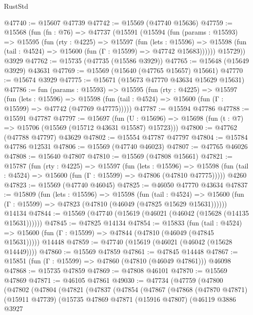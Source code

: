 \begin{lexlean}{RustStd}
\begin{coremodule}
@47740 := @15607 @47739
@47742 := @15569 (@47740 @15636)
@47759 := @15568
    (fun (fn : @76) =>
    @47737
      (@15591
        (@15594
          (fun (params : @15593) =>
          @15595
            (fun (rty : @4225) =>
            @15597
              (fun (lets : @15596) =>
              @15598 (fun (tail : @4524) => @15600 (fun (Γ : @15599) => @47742 @15683))))))
        @15729))
    @3929
@47762 := @15735 (@47735 (@15586 @3929))
@47765 := @15648 (@15649 @3929) @43631
@47769 := @15569 (@15640 (@47765 @15657) @15661)
@47770 := @15674 @3929
@47775 := @15671 (@15673 @47770 @43634 @15629 @15631)
@47786 := fun (params : @15593) =>
  @15595
    (fun (rty : @4225) =>
    @15597
      (fun (lets : @15596) =>
      @15598 (fun (tail : @4524) => @15600 (fun (Γ : @15599) => @47742 (@47769 @47775)))))
@47787 := @15594 @47786
@47788 := @15591 @47787
@47797 := @15697
    (fun (U : @15696) => @15698 (fun (t : @7) => @15706 (@15569 (@15712 @43631 @15587) @15723)))
@47800 := @47762 (@47788 @47797) @43629
@47802 := @15554 @47787 @47797
@47804 := @15784 @47786 @12531
@47806 := @15569 (@47740 @46023)
@47807 := @47765 @46026
@47808 := @15640 @47807
@47810 := @15569 (@47808 @15661)
@47821 := @15787
    (fun (rty : @4225) =>
    @15597
      (fun (lets : @15596) =>
      @15598 (fun (tail : @4524) => @15600 (fun (Γ : @15599) => @47806 (@47810 @47775)))))
    @4260
@47823 := @15569 (@47740 @46045)
@47825 := @46050 @47770 @43634
@47837 := @15809
    (fun (lets : @15596) =>
    @15598
      (fun (tail : @4524) =>
      @15600 (fun (Γ : @15599) => @47823 (@47810 (@46049 (@47825 @15629 @15631))))))
    @14134
@47844 := @15569 (@47740 (@15619 (@46021 (@46042 (@15628 (@14135 @15631))))))
@47845 := @47825 @14134
@47854 := @15833
    (fun (tail : @4524) => @15600 (fun (Γ : @15599) => @47844 (@47810 (@46049 (@47845 @15631)))))
    @14448
@47859 := @47740 (@15619 (@46021 (@46042 (@15628 @14449))))
@47860 := @15569 @47859
@47861 := @47845 @14448
@47867 := @15851 (fun (Γ : @15599) => @47860 (@47810 (@46049 @47861))) @46098
@47868 := @15735 @47859
@47869 := @47808 @46101
@47870 := @15569 @47869
@47871 := @46105 @47861
@49030 := @47734
    (@47759
      (@47800
        (@47802
          (@47804
            (@47821
              (@47837
                (@47854
                  (@47867
                    (@47868
                      (@47870 @47871)
                      (@15911 @47739)
                      (@15735
                        @47869
                        @47871
                        (@15916 @47807)
                        (@46119
                          @3886
                          @3927

\end{coremodule}
\end{lexlean}
